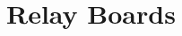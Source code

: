 \documentclass[../../main]{subfiles}
\begin{document}
\section{Relay Boards} \label{sec:}
\end{document}
